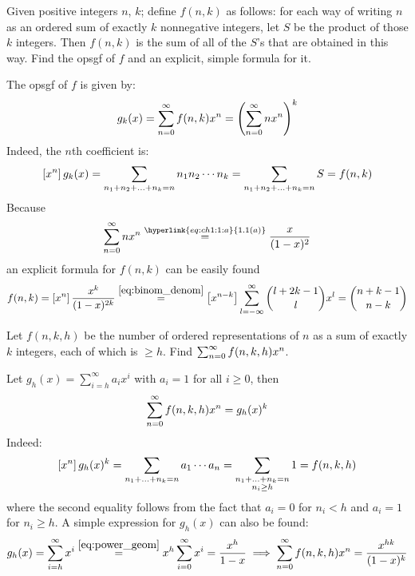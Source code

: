 \begin{exercise}
    Given positive integers $n$, $k$; define $f(n,k)$ as follows: for each way of writing $n$ as an ordered sum of exactly $k$ nonnegative integers, let $S$ be the product of those $k$ integers. Then $f(n,k)$ is the sum of all of the $S$'s that are obtained in this way. Find the opsgf of $f$ and an explicit, simple formula for it.
\end{exercise}
\begin{solution}
    The opsgf of $f$ is given by:
    \[
        g_k(x) = \bsum f(n,k) x^n = \left( \bsum nx^n\right)^k
    \]
    Indeed, the $n$th coefficient is:
    \[
        \coeff{x^n}g_k(x) = \sum_{n_1 + n_2 + \ldots + n_k = n} n_1 n_2 \cdots n_k = \sum_{n_1 + n_2 + \ldots + n_k = n} S = f(n, k)
    \]
    Because
    \[
        \bsum nx^n \estep{\hyperlink{eq:ch1:1:a}{1.1(a)}} \frac{x}{(1-x)^2}
    \]
    an explicit formula for $f(n,k)$ can be easily found
    \[
        f(n,k) = \coeff{x^n} \frac{x^k}{(1-x)^{2k}} \estep{\eqref{eq:binom_denom}} \coeff{x^{n-k}}\infsum[l] \binom{l+2k-1}{l} x^l = \binom{n+k-1}{n-k}
    \]
\end{solution}

\begin{exercise}
    Let $f(n,k,h)$ be the number of ordered representations of $n$ as a sum of exactly $k$ integers, each of which is $\geq h$. Find $\bsum f(n,k,h)x^n$.
\end{exercise}
\begin{solution}
    Let $g_h(x) = \sum_{i=h}^\infty a_ix^i$ with $a_i=1$ for all $i\geq 0$, then
    \[
        \bsum f(n,k,h)x^n = g_h(x)^k
    \]
    Indeed:
    \[
        \coeff{x^n}g_h(x)^k = \sum_{n_1+\ldots+n_k = n} a_1\cdots a_n = \sum_{\substack{n_1+\ldots+n_k = n \\ n_i \geq h}} 1 = f(n,k,h)
    \]
    where the second equality follows from the fact that $a_i =0$ for $n_i < h$ and $a_i = 1$ for $n_i \geq h$. A simple expression for $g_h(x)$ can also be found:
    \[
        g_h(x) = \sum_{i=h}^\infty x^i \estep{\eqref{eq:power_geom}} x^h \bsum[i] x^i = \frac{x^h}{1-x} \implies  \bsum f(n,k,h)x^n = \frac{x^{hk}}{(1-x)^k}
    \]
\end{solution}

